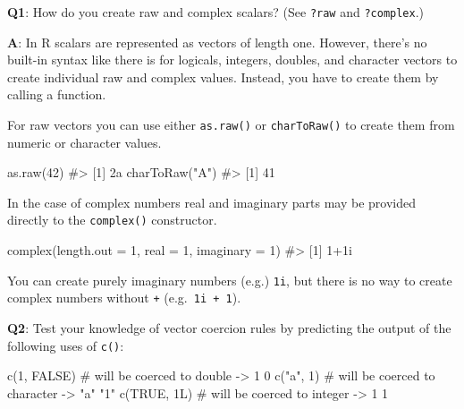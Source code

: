\documentclass[
]{krantz}
\makeatletter
\newenvironment{Shaded}{\begin{snugshade}}{\end{snugshade}}
\newcommand{\CommentTok}[1]{\textcolor[rgb]{0.56,0.35,0.01}{\textit{#1}}}
\newcommand{\DataTypeTok}[1]{\textcolor[rgb]{0.13,0.29,0.53}{#1}}
\newcommand{\DecValTok}[1]{\textcolor[rgb]{0.00,0.00,0.81}{#1}}
\newcommand{\KeywordTok}[1]{\textcolor[rgb]{0.13,0.29,0.53}{\textbf{#1}}}
\newcommand{\NormalTok}[1]{#1}
\newcommand{\OtherTok}[1]{\textcolor[rgb]{0.56,0.35,0.01}{#1}}
\newcommand{\StringTok}[1]{\textcolor[rgb]{0.31,0.60,0.02}{#1}}
\newenvironment{kframe}{%
\medskip{}
\setlength{\fboxsep}{.8em}
 \def\at@end@of@kframe{}%
 \ifinner\ifhmode%
  \def\at@end@of@kframe{\end{minipage}}%
  \begin{minipage}{\columnwidth}%
 \fi\fi%
 \def\FrameCommand##1{\hskip\@totalleftmargin \hskip-\fboxsep
 \colorbox{shadecolor}{##1}\hskip-\fboxsep
     \hskip-\linewidth \hskip-\@totalleftmargin \hskip\columnwidth}%
 \MakeFramed {\advance\hsize-\width
   \@totalleftmargin\z@ \linewidth\hsize
   \@setminipage}}%
 {\par\unskip\endMakeFramed%
 \at@end@of@kframe}
\renewenvironment{Shaded}{\begin{kframe}}{\end{kframe}}
\renewcommand{\KeywordTok} [1]{\textcolor[rgb]{0.00,0.44,0.13}{{#1}}}
\renewcommand{\DataTypeTok}[1]{\textcolor[rgb]{0.56,0.13,0.00}{{#1}}}
\renewcommand{\DecValTok}  [1]{\textcolor[rgb]{0.25,0.63,0.44}{{#1}}}
\renewcommand{\StringTok}  [1]{\textcolor[rgb]{0.25,0.44,0.63}{{#1}}}
\renewcommand{\CommentTok} [1]{\textcolor[rgb]{0.38,0.63,0.69}{{#1}}}
\renewcommand{\OtherTok}   [1]{\textcolor[rgb]{0.00,0.44,0.13}{{#1}}}
\renewcommand{\NormalTok}  [1]{{#1}}
\makeatother
\begin{document}
\textbf{{Q1}}: How do you create raw and complex scalars? (See \texttt{?raw} and \texttt{?complex}.)

\textbf{{A}}: In R scalars are represented as vectors of length one. However, there's no built-in syntax like there is for logicals, integers, doubles, and character vectors to create individual raw and complex values. Instead, you have to create them by calling a function.

For raw vectors you can use either \texttt{as.raw()} or \texttt{charToRaw()} to create them from numeric or character values.

\begin{Shaded}
\begin{Highlighting}[]
\KeywordTok{as.raw}\NormalTok{(}\DecValTok{42}\NormalTok{)}
\CommentTok{#> [1] 2a}
\KeywordTok{charToRaw}\NormalTok{(}\StringTok{"A"}\NormalTok{)}
\CommentTok{#> [1] 41}
\end{Highlighting}
\end{Shaded}

In the case of complex numbers real and imaginary parts may be provided directly to the \texttt{complex()} constructor.

\begin{Shaded}
\begin{Highlighting}[]
\KeywordTok{complex}\NormalTok{(}\DataTypeTok{length.out =} \DecValTok{1}\NormalTok{, }\DataTypeTok{real =} \DecValTok{1}\NormalTok{, }\DataTypeTok{imaginary =} \DecValTok{1}\NormalTok{)}
\CommentTok{#> [1] 1+1i}
\end{Highlighting}
\end{Shaded}

You can create purely imaginary numbers (e.g.) \texttt{1i}, but there is no way to create complex numbers without \texttt{+} (e.g.~\texttt{1i\ +\ 1}).

\textbf{{Q2}}: Test your knowledge of vector coercion rules by predicting the output of the following uses of \texttt{c()}:

\begin{Shaded}
\begin{Highlighting}[]
\KeywordTok{c}\NormalTok{(}\DecValTok{1}\NormalTok{, }\OtherTok{FALSE}\NormalTok{)      }\CommentTok{# will be coerced to double    -> 1 0}
\KeywordTok{c}\NormalTok{(}\StringTok{"a"}\NormalTok{, }\DecValTok{1}\NormalTok{)        }\CommentTok{# will be coerced to character -> "a" "1"}
\KeywordTok{c}\NormalTok{(}\OtherTok{TRUE}\NormalTok{, 1L)      }\CommentTok{# will be coerced to integer   -> 1 1}
\end{Highlighting}
\end{Shaded}
\end{document}
